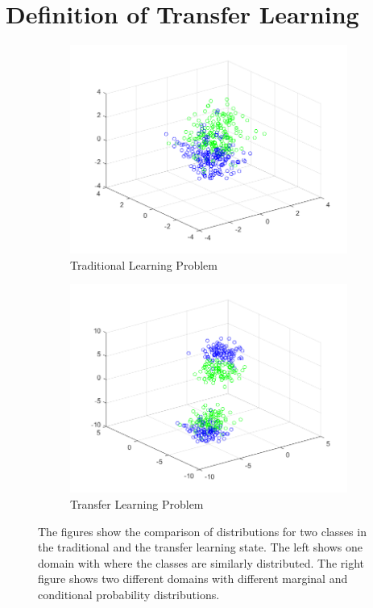 \section{Definition of Transfer Learning}\label{TlSecDef}
\begin{figure}
	\centering
	\begin{subfigure}{.5\textwidth}
		\centering
		\includegraphics[width=1\linewidth]{figures/TraditionalProblem.png}
		\caption{Traditional Learning Problem\label{FigTradProblem}}
	\end{subfigure}%
	\begin{subfigure}{.5\textwidth}
		\centering
		\includegraphics[width=1\linewidth]{figures/TransferProblem.png}
		\caption{Transfer Learning Problem \label{FigTLProblem}}
	\end{subfigure}
	\caption[Comparison of Transfer and Traditional Learning Problems]{The figures show the comparison of distributions for two classes in the traditional and the transfer learning state. The left shows one domain with where the classes are similarly distributed. The right figure shows two different domains with different marginal and conditional probability distributions.\label{FigProblemComparison}}
\end{figure}
